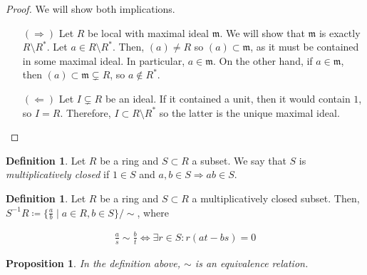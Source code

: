 \documentclass[11pt]{article}
\newtheorem{prop}[theorem]{Proposition}
\theoremstyle{definition}
\newtheorem{defn}[theorem]{Definition}
\begin{document}
            \begin{proof}
            We will show both implications.
                \begin{itemize}
                    \item[$(\Rightarrow)$] Let $R$ be local with maximal ideal $\mathfrak{m}$.
                    We will show that $\mathfrak{m}$ is exactly $R \setminus R^*$.
                    Let $a \in R \setminus R^*$.
                    Then, $(a) \neq R$ so $(a) \subset \mathfrak{m}$, as it must be contained in some maximal ideal.
                    In particular, $a \in \mathfrak{m}$.
                    On the other hand,
                    if $a \in \mathfrak{m}$, then $(a) \subset \mathfrak{m} \subsetneq R$, so $a \notin R^*$.

                    \item[$(\Leftarrow)$] Let $I \subsetneq R$ be an ideal.
                    If it contained a unit, then it would contain $1$, so $I = R$.
                    Therefore, $I \subset R \setminus R^*$ so the latter is the unique maximal ideal.
                \end{itemize}
            \end{proof}

        \begin{defn}
            Let $R$ be a ring and $S \subset R$ a subset.
            We say that $S$ is \emph{multiplicatively closed} if $1 \in S$ and $a, b \in S \Rightarrow ab \in S$.
        \end{defn}

        \begin{defn}
            Let $R$ be a ring and $S \subset R$ a multiplicatively closed subset.
            Then, $S^{-1}R \coloneqq \{\frac{a}{b} \mid a \in R, b \in S\}/\sim$,
            where

            \begin{align}
                \frac{a}{s} \sim \frac{b}{t}  \Leftrightarrow \exists r \in S \colon  r (at - bs) = 0
            \end{align}
        \end{defn}

        \begin{prop}
            In the definition above, $\sim$ is an equivalence relation.
        \end{prop}
\end{document}
